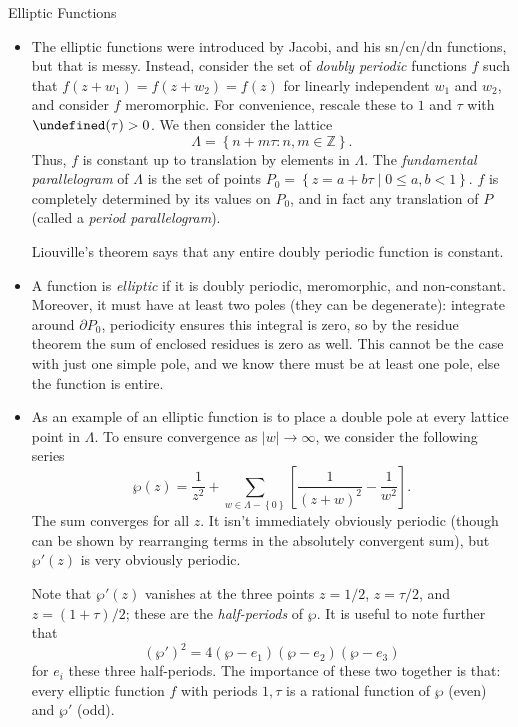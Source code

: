 \documentclass[11pt,
        usenames, %
        dvipsnames %
    ]{report}
\newcommand*{\abs}[1]{\left|#1\right|}
\newcommand*{\p}[1]{\left(#1\right)}
\newcommand*{\s}[1]{\left[#1\right]}
\newcommand*{\z}[1]{\left\{#1\right\}}
\let\Im\undefined
\DeclareMathOperator{\Im}{Im}
\begin{document}
Elliptic Functions
\begin{itemize}
    \item The elliptic functions were introduced by Jacobi, and his sn/cn/dn
        functions, but that is messy. Instead, consider the set of \emph{doubly
        periodic} functions $f$ such that $f\p{z + w_1} = f\p{z + w_2} = f(z)$
        for linearly independent $w_1$ and $w_2$, and consider $f$ meromorphic.
        For convenience, rescale these to $1$ and $\tau$ with $\Im(\tau) > 0$.
        We then consider the lattice
        \begin{equation}
            \Lambda = \z{n + m\tau: n, m \in \mathbb{Z}}.
        \end{equation}
        Thus, $f$ is constant up to translation by elements in $\Lambda$. The
        \emph{fundamental parallelogram} of $\Lambda$ is the set of points $P_0
        = \z{z = a + b\tau \mid 0 \leq a, b < 1}$. $f$ is completely determined
        by its values on $P_0$, and in fact any translation of $P$ (called a
        \emph{period parallelogram}).

        Liouville's theorem says that any entire doubly periodic function is
        constant.

    \item A function is \emph{elliptic} if it is doubly periodic, meromorphic,
        and non-constant. Moreover, it must have at least two poles (they can be
        degenerate): integrate around $\partial P_0$, periodicity ensures this
        integral is zero, so by the residue theorem the sum of enclosed residues
        is zero as well. This cannot be the case with just one simple pole, and
        we know there must be at least one pole, else the function is entire.

    \item As an example of an elliptic function is to place a double pole at
        every lattice point in $\Lambda$. To ensure convergence as $\abs{w} \to
        \infty$, we consider the following series
        \begin{equation}
            \wp(z) = \frac{1}{z^2} + \sum\limits_{w \in \Lambda - \z{0}}
                \s{\frac{1}{\p{z + w}^2} - \frac{1}{w^2}}.
        \end{equation}
        The sum converges for all $z$. It isn't immediately obviously periodic
        (though can be shown by rearranging terms in the absolutely convergent
        sum), but $\wp'(z)$ is very obviously periodic.

        Note that $\wp'(z)$ vanishes at the three points $z = 1/2$, $z =
        \tau/2$, and $z = (1 + \tau)/2$; these are the \emph{half-periods} of
        $\wp$. It is useful to note further that
        \begin{equation}
            (\wp')^2 = 4\p{\wp - e_1}\p{\wp - e_2}\p{\wp - e_3}
        \end{equation}
        for $e_i$ these three half-periods. The importance of these two together
        is that: every elliptic function $f$ with periods $1, \tau$ is a
        rational function of $\wp$ (even) and $\wp'$ (odd).


\end{itemize}
\end{document}
